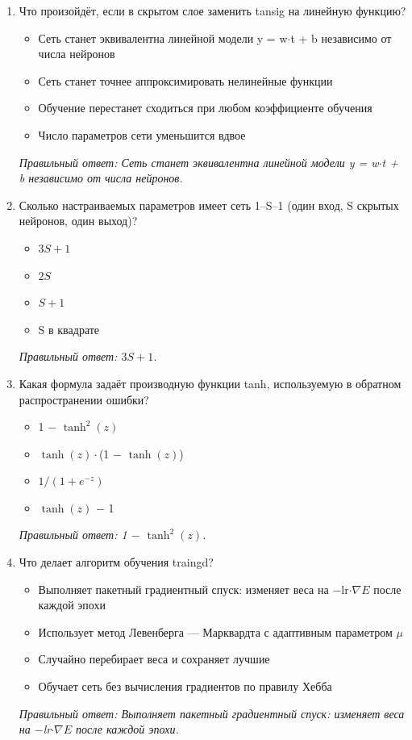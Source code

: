 \begin{enumerate}[label=\textbf{\arabic*.}, leftmargin=0pt, itemsep=1.2em]
\item Что произойдёт, если в скрытом слое заменить tansig на линейную функцию?
\begin{itemize}[label=$\square$, leftmargin=1.5cm, itemsep=0.2em, topsep=0.3em]
\item Сеть станет эквивалентна линейной модели y = w$\cdot$t + b независимо от числа нейронов
\item Сеть станет точнее аппроксимировать нелинейные функции
\item Обучение перестанет сходиться при любом коэффициенте обучения
\item Число параметров сети уменьшится вдвое
\end{itemize}
{\small\textit{Правильный ответ: Сеть станет эквивалентна линейной модели y = w$\cdot$t + b независимо от числа нейронов.}}

\item Сколько настраиваемых параметров имеет сеть 1–S–1 (один вход, S скрытых нейронов, один выход)?
\begin{itemize}[label=$\square$, leftmargin=1.5cm, itemsep=0.2em, topsep=0.3em]
\item $3S+1$
\item $2S$
\item $S+1$
\item S в квадрате
\end{itemize}
{\small\textit{Правильный ответ: $3S+1$.}}

\item Какая формула задаёт производную функции tanh, используемую в обратном распространении ошибки?
\begin{itemize}[label=$\square$, leftmargin=1.5cm, itemsep=0.2em, topsep=0.3em]
\item 1 $-$ $\tanh^2(z)$
\item $\tanh(z)\cdot$(1 $-$ $\tanh(z)$)
\item $1/(1+e^{-z})$
\item $\tanh(z)$ $-$ 1
\end{itemize}
{\small\textit{Правильный ответ: 1 $-$ $\tanh^2(z)$.}}

\item Что делает алгоритм обучения traingd?
\begin{itemize}[label=$\square$, leftmargin=1.5cm, itemsep=0.2em, topsep=0.3em]
\item Выполняет пакетный градиентный спуск: изменяет веса на $-$lr$\cdot\nabla E$ после каждой эпохи
\item Использует метод Левенберга — Марквардта с адаптивным параметром $\mu$
\item Случайно перебирает веса и сохраняет лучшие
\item Обучает сеть без вычисления градиентов по правилу Хебба
\end{itemize}
{\small\textit{Правильный ответ: Выполняет пакетный градиентный спуск: изменяет веса на $-$lr$\cdot\nabla E$ после каждой эпохи.}}


\end{enumerate}
